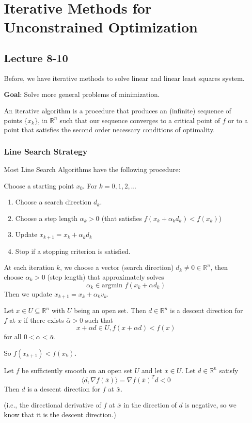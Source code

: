 \section{Iterative Methods for Unconstrained Optimization}
\subsection{Lecture 8-10}
Before, we have iterative methods to solve linear and linear least squares system.

\textbf{Goal}: Solve more general problems of minimization.

An iterative algorithm is a procedure that produces an (infinite) sequence of points $\{x_k\}$, in $\mathbb R^n$ such that our sequence converges to a critical point of $f$ or to a point that satisfies the second order necessary conditions of optimality.

\subsubsection{Line Search Strategy}
Most Line Search Algorithms have the following procedure:

Choose a starting point $x_0$. For $k = 0,1,2,\ldots$
\begin{enumerate}
  \item Choose a search direction $d_k$.
  \item Choose a step length $\alpha_k > 0$ (that satisfies $f(x_k + \alpha_k d_k) < f(x_k)$)
  \item Update $x_{k+1} = x_k + \alpha_k d_k$
  \item Stop if a stopping criterion is satisfied.
\end{enumerate}
\begin{definition}
  At each iteration $k$, we choose a vector (search direction) $d_k \neq 0 \in \mathbb R^n$, then choose $\alpha_k > 0$ (step length) that approximately solves
$$\alpha_k \in \text{argmin } f(x_k + \alpha d_k)$$
Then we update $x_{k+1} = x_k + \alpha_k v_k$.
\end{definition}
\begin{definition}
  Let $x \in U \subseteq \mathbb R^n$ with $U$ being an open set. Then $d \in \mathbb R^n$ is a descent direction for $f$ at $x$ if there exists $\bar \alpha > 0$ such that $$x + \alpha d \in U, f(x + \alpha d) < f(x)$$ for all $0 < \alpha < \bar \alpha$.

  \bigskip So $f(x_{k+1}) < f(x_k)$.
\end{definition}
\begin{lemma}
  Let $f$ be sufficiently smooth on an open set $U$ and let $\bar x \in U$. Let $d \in \mathbb R^n$ satisfy $$\langle d, \nabla f(\bar x) \rangle = \nabla f(\bar x)^T d < 0$$ Then $d$ is a descent direction for $f$ at $\bar x$.

  \bigskip (i.e., the directional derivative of $f$ at $\bar x$ in the direction of $d$ is negative, so we know that it is the descent direction.)
\end{lemma}

